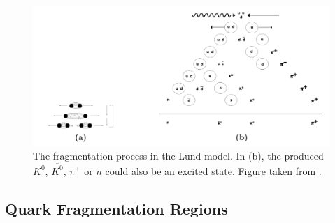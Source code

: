 \begin{figure}[!h]
  \centering
	\includegraphics[scale=0.45]{./gfx/Lund.png}
	\caption{The fragmentation process in the Lund model. In (b), the produced $K^0$, $\overline{K^0}$, $\pi^+$ or $n$ could also be an excited state. Figure taken from \cite{Panknin}.}
	\label{pic:Lund}
\end{figure}

\subsection{Quark Fragmentation Regions}

